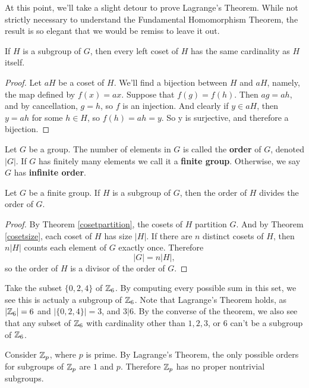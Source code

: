 At this point, we'll take a slight detour to prove Lagrange's Theorem. While not strictly necessary to understand the Fundamental Homomorphism Theorem, the result is so elegant that we would be remiss to leave it out.

\begin{theorem}
\label{cosetsize}
If \extra $H$ is a subgroup of $G$, then every left coset of $H$ has the same cardinality as $H$ itself.
\end{theorem}

\begin{proof}
Let $aH$ be a coset of $H$. We'll find a bijection between $H$ and $aH$, namely, the map defined by $f(x) = ax$. Suppose that $f(g) = f(h)$. Then $ag = ah$, and by cancellation, $g=h$, so $f$ is an injection. And clearly if $y \in aH$, then $y = ah$ for some $h \in H$, so $f(h) = ah = y$. So y is surjective, and therefore a bijection.
\end{proof}

\begin{definition}
Let \extra $G$ be a group. The number of elements in $G$ is called the \textbf{order} of $G$, denoted $|G|$. If $G$ has finitely many elements we call it a \textbf{finite group}. Otherwise, we say $G$ has \textbf{infinite order}.
\end{definition}

\begin{theorem}
Let \extra $G$ be a finite group. If $H$ is a subgroup of $G$, then the order of $H$ divides the order of $G$.
\end{theorem}

\begin{proof}
By Theorem \ref{cosetpartition}, the cosets of $H$ partition $G$. And by Theorem \ref{cosetsize}, each coset of $H$ has size $|H|$. If there are $n$ distinct cosets of $H$, then $n|H|$ counts each element of $G$ exactly once. Therefore
\begin{equation*}
    |G| = n|H|\mathrm{,}
\end{equation*}
so the order of $H$ is a divisor of the order of $G$.

\end{proof}

\begin{example}
Take the subset $\{0, 2, 4\}$ of $\zn[6]$. By computing every possible sum in this set, we see this is actualy a subgroup of $\zn[6]$. Note that Lagrange's Theorem holds, as $\left|\zn[6]\right| = 6$ and $|\{0, 2, 4\}| = 3$, and $3|6$. By the converse of the theorem, we also see that any subset of $\zn[6]$ with cardinality other than $1, 2, 3$, or $6$ can't be a subgroup of $\zn[6]$.
\end{example}

\begin{example}
Consider $\zn[p]$, where $p$ is prime. By Lagrange's Theorem, the only possible orders for subgroups of $\zn[p]$ are $1$ and $p$. Therefore $\zn[p]$ has no proper nontrivial subgroups.
\end{example}